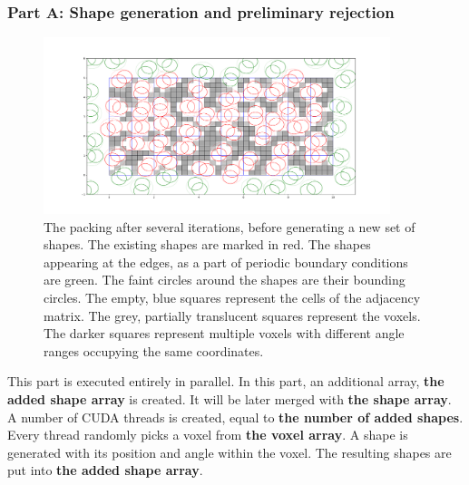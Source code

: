 \documentclass[12pt, oneside]{report}
\begin{document}
\subsubsection{Part A: Shape generation and preliminary rejection}

\begin{figure}[H]
  \centering
	\includegraphics[width=0.9\textwidth,keepaspectratio]{Images/GPURSA/Figure_1.pdf}
	\caption{The packing after several iterations, before generating a new set of shapes.\newline
	The existing shapes are marked in red. The shapes appearing at the edges, as a part of periodic boundary conditions are green. The faint circles around the shapes are their bounding circles. The empty, blue squares represent the cells of the adjacency matrix. The grey, partially translucent squares represent the voxels. The darker squares represent multiple voxels with different angle ranges occupying the same coordinates.}
	\label{GPURSA_Process_1}
\end{figure}

\newpage

This part is executed entirely in parallel. \newline
In this part, an additional array, \textbf{the added shape array} is created. It will be later merged with \textbf{the shape array}. \newline
A number of CUDA threads is created, equal to \textbf{the number of added shapes}. Every thread randomly picks a voxel from \textbf{the voxel array}. A shape is generated with its position and angle within the voxel. The resulting shapes are put into \textbf{the added shape array}.
\end{document}

